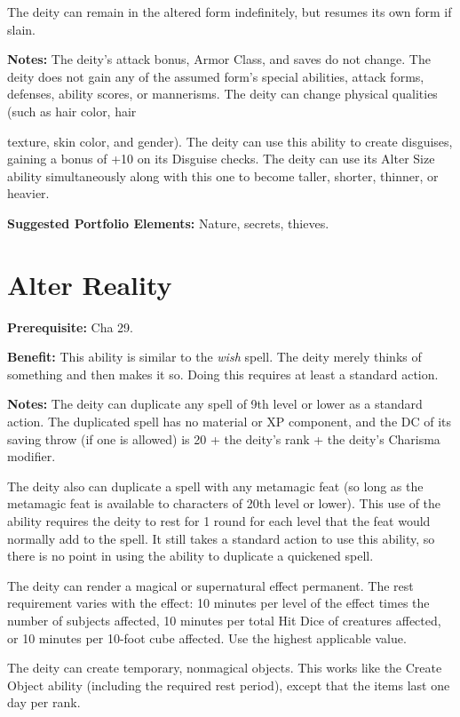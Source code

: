 \documentclass{article}
\begin{document}
The deity can remain in the altered form indefinitely, but resumes its own form 
if slain.

\textbf{Notes:} The deity's attack bonus, Armor Class, and saves do not change. 
The deity does not gain any of the assumed form's special abilities, attack forms, 
defenses, ability scores, or mannerisms. The deity can change physical qualities 
(such as hair color, hair

texture, skin color, and gender). The deity can use this ability to create disguises, 
gaining a bonus of +10 on its Disguise checks. The deity can use its Alter Size 
ability simultaneously along with this one to become taller, shorter, thinner, 
or heavier.

\textbf{Suggested Portfolio Elements:} Nature, secrets, thieves.

\vspace{12pt}
\section*{Alter Reality}

\textbf{Prerequisite:} Cha 29.

\textbf{Benefit:} This ability is similar to the \textit{wish }spell. The deity 
merely thinks of something and then makes it so. Doing this requires at least a 
standard action.

\textbf{Notes:} The deity can duplicate any spell of 9th level or lower as a standard 
action. The duplicated spell has no material or XP component, and the DC of its 
saving throw (if one is allowed) is 20 + the deity's rank + the deity's Charisma 
modifier. 

The deity also can duplicate a spell with any metamagic feat (so long as the metamagic 
feat is available to characters of 20th level or lower). This use of the ability 
requires the deity to rest for 1 round for each level that the feat would normally 
add to the spell. It still takes a standard action to use this ability, so there 
is no point in using the ability to duplicate a quickened spell. 

The deity can render a magical or supernatural effect permanent. The rest requirement 
varies with the effect: 10 minutes per level of the effect times the number of 
subjects affected, 10 minutes per total Hit Dice of creatures affected, or 10 minutes 
per 10-foot cube affected. Use the highest applicable value. 

The deity can create temporary, nonmagical objects. This works like the Create 
Object ability (including the required rest period), except that the items last 
one day per rank.
\end{document}
